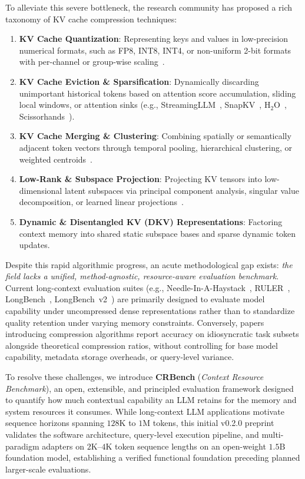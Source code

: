 \documentclass[11pt,a4paper]{article}
\begin{document}
To alleviate this severe bottleneck, the research community has proposed a rich taxonomy of KV cache compression techniques:
\begin{enumerate}[leftmargin=*]
    \item \textbf{KV Cache Quantization}: Representing keys and values in low-precision numerical formats, such as FP8, INT8, INT4, or non-uniform 2-bit formats with per-channel or group-wise scaling~\cite{dettmers2022llmint8,hooper2024kvquant,liu2024kivi,zhang2024fp8}.
    \item \textbf{KV Cache Eviction \& Sparsification}: Dynamically discarding unimportant historical tokens based on attention score accumulation, sliding local windows, or attention sinks (e.g., StreamingLLM~\cite{xiao2023streamingllm}, SnapKV~\cite{li2024snapkv}, $\text{H}_2\text{O}$~\cite{zhang2023h2o}, Scissorhands~\cite{liu2023scissorhands}).
    \item \textbf{KV Cache Merging \& Clustering}: Combining spatially or semantically adjacent token vectors through temporal pooling, hierarchical clustering, or weighted centroids~\cite{ge2023model,zhang2024pyramidkv}.
    \item \textbf{Low-Rank \& Subspace Projection}: Projecting KV tensors into low-dimensional latent subspaces via principal component analysis, singular value decomposition, or learned linear projections~\cite{sharma2023truth,chen2024compressing}.
    \item \textbf{Dynamic \& Disentangled KV (DKV) Representations}: Factoring context memory into shared static subspace bases and sparse dynamic token updates.
\end{enumerate}

Despite this rapid algorithmic progress, an acute methodological gap exists: \textit{the field lacks a unified, method-agnostic, resource-aware evaluation benchmark}. Current long-context evaluation suites (e.g., Needle-In-A-Haystack~\cite{kamradt2023needle}, RULER~\cite{hsieh2024ruler}, LongBench~\cite{bai2023longbench}, LongBench~v2~\cite{bai2024longbenchv2}) are primarily designed to evaluate model capability under uncompressed dense representations rather than to standardize quality retention under varying memory constraints. Conversely, papers introducing compression algorithms report accuracy on idiosyncratic task subsets alongside theoretical compression ratios, without controlling for base model capability, metadata storage overheads, or query-level variance.

To resolve these challenges, we introduce \textbf{CRBench} (\textit{Context Resource Benchmark}), an open, extensible, and principled evaluation framework designed to quantify how much contextual capability an LLM retains for the memory and system resources it consumes. While long-context LLM applications motivate sequence horizons spanning $128\text{K}$ to $1\text{M}$ tokens, this initial v0.2.0 preprint validates the software architecture, query-level execution pipeline, and multi-paradigm adapters on $2\text{K}$--$4\text{K}$ token sequence lengths on an open-weight $1.5\text{B}$ foundation model, establishing a verified functional foundation preceding planned larger-scale evaluations.
\end{document}
